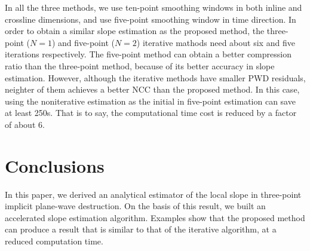 In all the three methods, we use ten-point smoothing windows 
in both inline and crossline dimensions,
and use five-point smoothing window in time direction.
In order to obtain a similar slope estimation as the proposed method,
the three-point ($N=1$) and five-point ($N=2$) iterative mathods 
need about six and five iterations respectively. 
The five-point method can obtain a better compression ratio than the three-point method, 
because of its better accuracy in slope estimation.
However, although the iterative methods have smaller PWD residuals,
neighter of them achieves a better NCC than the proposed method.
In this case, using the noniterative estimation as the initial 
in five-point estimation can save at least 250s.
That is to say,
the computational time cost is reduced by a factor of about 6.




\section{Conclusions}

In this paper, we derived an analytical estimator of the local slope
in three-point implicit plane-wave destruction.
On the basis of this result, we built an accelerated slope estimation algorithm.
Examples show that the proposed method can produce  a result that is 
similar to that of the iterative algorithm,
at a reduced computation time.


